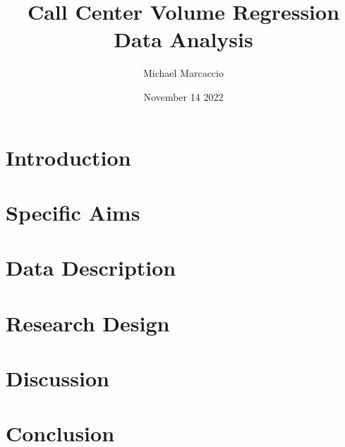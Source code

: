 \documentclass[12pt]{article}
\title{Call Center Volume Regression Data Analysis }
\author{Michael  Marcaccio}
\date{November 14 2022}
\begin{document}
\maketitle

\section*{Introduction}


\section*{Specific Aims}

    
\section*{Data Description}


\section*{Research Design}


\section*{Discussion}



\section*{Conclusion}


\end{document}
